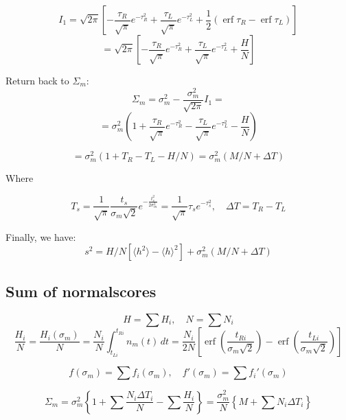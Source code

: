 \documentclass[12pt]{article}
\begin{document}
\[
    I_1 = \sqrt{2\pi}
    \left[
        -\frac{\tau_R}{\sqrt{\pi}} e^{-\tau_R^2} +
        \frac{\tau_L}{\sqrt{\pi}} e^{-\tau_L^2} +
        \frac{1}{2} \left(
        \operatorname{erf} \tau_R -
        \operatorname{erf} \tau_L
        \right)
    \right]
\]
\[
    = \sqrt{2\pi}
    \left[
        -\frac{\tau_R}{\sqrt{\pi}} e^{-\tau_R^2} +
        \frac{\tau_L}{\sqrt{\pi}} e^{-\tau_L^2} +
        \frac{H}{N}
    \right]
\]

Return back to \(\Sigma_m\):
\[
\Sigma_m = \sigma_m^2 - \frac{\sigma_m^2}{\sqrt{2\pi}} I_1 =
\]
\[
= \sigma_m^2
\left(
    1 +
    \frac{\tau_R}{\sqrt{\pi}} e^{-\tau_R^2} -
    \frac{\tau_L}{\sqrt{\pi}} e^{-\tau_L^2} -
    \frac{H}{N}
\right)
\]

\[
= \sigma_m^2
\left(
    1 + T_R - T_L - H / N
\right)
= \sigma_m^2
\left(
    M / N + \Delta T
\right)
\]

Where

\[
    T_s =
    \frac{1}{\sqrt{\pi}} \frac{t_s}{\sigma_m\sqrt{2}} e^{-\frac{t_s^2}{2\sigma_m^2}} =
    \frac{1}{\sqrt{\pi}} \tau_s e^{-\tau_s^2}
    , \quad
    \Delta T = T_R - T_L
\]

Finally, we have:
\[
s^2 =
H/N \left[
    \langle h^2 \rangle - \langle h \rangle^2
\right] +
\sigma_m^2 (M / N + \Delta T)
\]

\subsection*{Sum of normalscores}

\[
    H = \sum H_i, \quad N = \sum N_i
\]
\[
\frac{H_i}{N} = \frac{H_i(\sigma_m)}{N} = \frac{N_i}{N} \int_{t_{Li}}^{t_{Ri}} n_m(t) \,dt =
\frac{N_i}{2N} \left[ \operatorname{erf}\left(\frac{t_{Ri}}{\sigma_m\sqrt{2}}\right) - \operatorname{erf}\left(\frac{t_{Li}}{\sigma_m\sqrt{2}}\right) \right]
\]

\[
f(\sigma_m) = \sum f_i(\sigma_m), \quad
f'(\sigma_m) = \sum {f_i}'(\sigma_m)
\]

\[
\Sigma_m =
\sigma_m^2
\left\{
    1 + \sum \frac{N_i \Delta T_i}{N} - \sum \frac{H_i}{N}
\right\} =
\frac{\sigma_m^2}{N}
\left\{
    M +
    \sum N_i \Delta T_i
\right\}
\]
\end{document}
